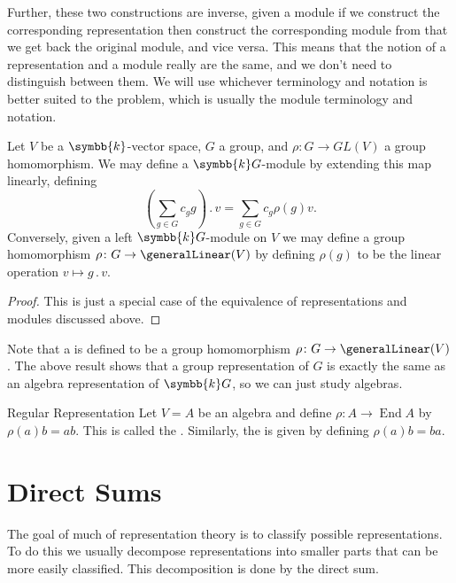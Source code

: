 \documentclass[fleqn]{NotesClass}
\renewcommand{\field}{\symbb{k}}
\DeclareMathOperator{\End}{End}
\newcommand{\action}{\mathbin{.}}
\begin{document}
    Further, these two constructions are inverse, given a module if we construct the corresponding representation then construct the corresponding module from that we get back the original module, and vice versa.
    This means that the notion of a representation and a module really are the same, and we don't need to distinguish between them.
    We will use whichever terminology and notation is better suited to the problem, which is usually the module terminology and notation.
    
    \begin{prp}{}{}
        Let \(V\) be a \(\field\)-vector space, \(G\) a group, and \(\rho \colon G \to GL(V)\) a group homomorphism.
        We may define a \(\field G\)-module by extending this map linearly, defining
        \begin{equation}
            \left( \sum_{g \in G} c_g g \right) \action v = \sum_{g \in G} c_g \rho(g)v.
        \end{equation}
        Conversely, given a left \(\field G\)-module on \(V\) we may define a group homomorphism \(\rho \colon G \to \generalLinear(V)\) by defining \(\rho(g)\) to be the linear operation \(v \mapsto g \action v\).
        \begin{proof}
            This is just a special case of the equivalence of representations and modules discussed above.
        \end{proof}
    \end{prp}
    
    Note that a  is defined to be a group homomorphism \(\rho \colon G \to \generalLinear(V)\).
    The above result shows that a group representation of \(G\) is exactly the same as an algebra representation of \(\field G\), so we can just study algebras.
    
    \begin{dfn}{Regular Representation}{}
        Let \(V = A\) be an algebra and define \(\rho \colon A \to \End A\) by \(\rho(a)b = ab\).
        This is called the .
        Similarly, the  is given by defining \(\rho(a)b = ba\).
    \end{dfn}
    
    \section{Direct Sums}
    The goal of much of representation theory is to classify possible representations.
    To do this we usually decompose representations into smaller parts that can be more easily classified.
    This decomposition is done by the direct sum.
    
\end{document}
